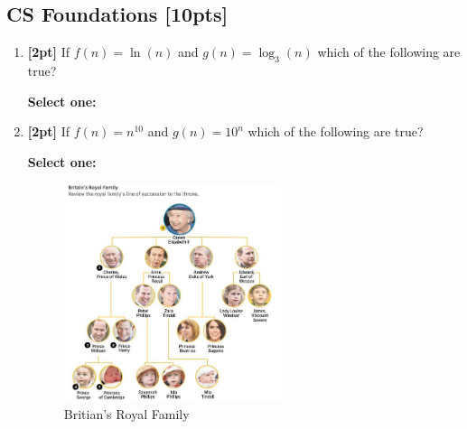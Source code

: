 \documentclass[12pt]{article}
\renewcommand{\circle}{\tikz\draw[black] (0,0) circle (1ex);}
\begin{document}
\subsection{CS Foundations [10pts]}
\begin{enumerate}
    \item \textbf{[2pt]} If $f(n)=\ln(n)$ and $g(n)=\log_3(n)$ which of the following are true?

    \textbf{Select one:}


    \item \textbf{[2pt]} If $f(n)=n^{10}$ and $g(n)=10^n$ which of the following are true?

    \textbf{Select one:}


    \begin{figure}[H]
        \centering
        \includegraphics[width=0.6\textwidth]{BritiansRoyalFamily.jpg}
        \caption{Britian's Royal Family}
        \label{Britian's Royal Family}
    \end{figure}
    

\end{enumerate}
\end{document}
